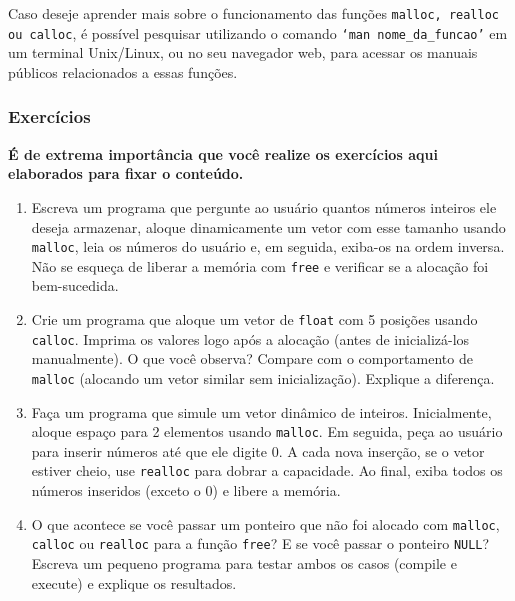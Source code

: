 Caso deseje aprender mais sobre o funcionamento das funções \texttt{malloc, 
realloc ou calloc}, é possível pesquisar utilizando o comando \texttt{`man 
nome\_da\_funcao'} em um terminal Unix/Linux, ou no seu navegador web, para 
acessar os manuais públicos relacionados a essas funções.

\subsubsection{Exercícios}

\textbf{É de extrema importância que você realize os exercícios aqui elaborados para fixar o conteúdo.}

\begin{enumerate}
    \item {Escreva um programa que pergunte ao usuário quantos números inteiros 
        ele deseja armazenar, aloque dinamicamente um vetor com esse tamanho 
        usando \texttt{malloc}, leia os números do usuário e, em seguida, 
        exiba-os na ordem inversa. Não se esqueça de liberar a memória com 
        \texttt{free} e verificar se a alocação foi bem-sucedida.}
    \item {Crie um programa que aloque um vetor de \texttt{float} com 5 posições 
        usando \texttt{calloc}. Imprima os valores logo após a alocação (antes 
        de inicializá-los manualmente). O que você observa? Compare com o 
        comportamento de \texttt{malloc} (alocando um vetor similar sem 
        inicialização). Explique a diferença.}
    \item {Faça um programa que simule um vetor dinâmico de inteiros. Inicialmente, 
        aloque espaço para 2 elementos usando \texttt{malloc}. Em seguida, 
        peça ao usuário para inserir números até que ele digite 0. A cada nova 
        inserção, se o vetor estiver cheio, use \texttt{realloc} para dobrar a 
        capacidade. Ao final, exiba todos os números inseridos (exceto o 0) e 
        libere a memória.}
    \item {O que acontece se você passar um ponteiro que não foi alocado com 
        \texttt{malloc}, \texttt{calloc} ou \texttt{realloc} para a função 
        \texttt{free}? E se você passar o ponteiro \texttt{NULL}? Escreva um 
        pequeno programa para testar ambos os casos (compile e execute) e 
        explique os resultados.}
\end{enumerate}
